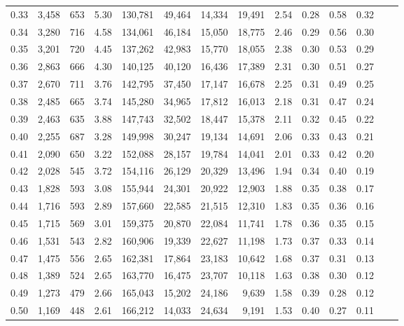 \begin{tabular}{rrrrrrrrrrrrrr}
0.33 &  3,458 &  653 &    5.30 &  130,781 &   49,464 &  14,334 &  19,491 &  2.54 &  0.28 &  0.58 &      0.32 \\
0.34 &  3,280 &  716 &    4.58 &  134,061 &   46,184 &  15,050 &  18,775 &  2.46 &  0.29 &  0.56 &      0.30 \\
0.35 &  3,201 &  720 &    4.45 &  137,262 &   42,983 &  15,770 &  18,055 &  2.38 &  0.30 &  0.53 &      0.29 \\
0.36 &  2,863 &  666 &    4.30 &  140,125 &   40,120 &  16,436 &  17,389 &  2.31 &  0.30 &  0.51 &      0.27 \\
0.37 &  2,670 &  711 &    3.76 &  142,795 &   37,450 &  17,147 &  16,678 &  2.25 &  0.31 &  0.49 &      0.25 \\
0.38 &  2,485 &  665 &    3.74 &  145,280 &   34,965 &  17,812 &  16,013 &  2.18 &  0.31 &  0.47 &      0.24 \\
0.39 &  2,463 &  635 &    3.88 &  147,743 &   32,502 &  18,447 &  15,378 &  2.11 &  0.32 &  0.45 &      0.22 \\
0.40 &  2,255 &  687 &    3.28 &  149,998 &   30,247 &  19,134 &  14,691 &  2.06 &  0.33 &  0.43 &      0.21 \\
0.41 &  2,090 &  650 &    3.22 &  152,088 &   28,157 &  19,784 &  14,041 &  2.01 &  0.33 &  0.42 &      0.20 \\
0.42 &  2,028 &  545 &    3.72 &  154,116 &   26,129 &  20,329 &  13,496 &  1.94 &  0.34 &  0.40 &      0.19 \\
0.43 &  1,828 &  593 &    3.08 &  155,944 &   24,301 &  20,922 &  12,903 &  1.88 &  0.35 &  0.38 &      0.17 \\
0.44 &  1,716 &  593 &    2.89 &  157,660 &   22,585 &  21,515 &  12,310 &  1.83 &  0.35 &  0.36 &      0.16 \\
0.45 &  1,715 &  569 &    3.01 &  159,375 &   20,870 &  22,084 &  11,741 &  1.78 &  0.36 &  0.35 &      0.15 \\
0.46 &  1,531 &  543 &    2.82 &  160,906 &   19,339 &  22,627 &  11,198 &  1.73 &  0.37 &  0.33 &      0.14 \\
0.47 &  1,475 &  556 &    2.65 &  162,381 &   17,864 &  23,183 &  10,642 &  1.68 &  0.37 &  0.31 &      0.13 \\
0.48 &  1,389 &  524 &    2.65 &  163,770 &   16,475 &  23,707 &  10,118 &  1.63 &  0.38 &  0.30 &      0.12 \\
0.49 &  1,273 &  479 &    2.66 &  165,043 &   15,202 &  24,186 &   9,639 &  1.58 &  0.39 &  0.28 &      0.12 \\
0.50 &  1,169 &  448 &    2.61 &  166,212 &   14,033 &  24,634 &   9,191 &  1.53 &  0.40 &  0.27 &      0.11 \\

\end{tabular}
